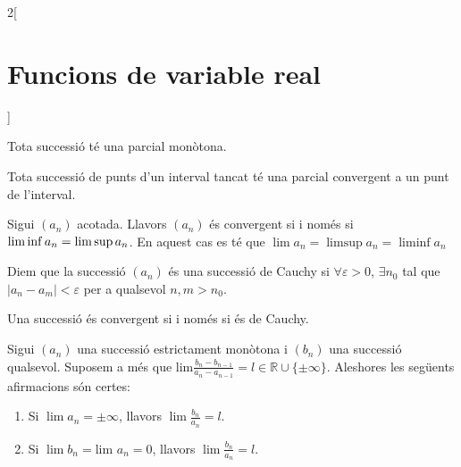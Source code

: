\documentclass[class=article,10pt,crop=false]{standalone}
\begin{document}
\begin{multicols}{2}[\section{Funcions de variable real}]
\begin{prop}
\end{prop}
\begin{prop}
Tota successió té una parcial mo\-nò\-to\-na.
\end{prop}
\begin{theorem}
Tota successió de punts d’un interval tancat té una parcial convergent a un punt de l'interval.
\end{theorem}
\begin{lemma}
Sigui $(a_n)$ acotada. Llavors $(a_n)$ és convergent si i només si $\liminf a_n\\=\limsup a_n$. En aquest cas es té que $\lim a_n=\limsup a_n=\liminf a_n$
\end{lemma}
\begin{definition}
Diem que la successió $(a_n)$ és una successió de Cauchy si $\forall \varepsilon>0$, $\exists n_0$ tal que $|a_n-a_m|<\varepsilon$ per a qualsevol $n,m>n_0$.
\end{definition}
\begin{theorem}
Una successió és convergent si i només si és de Cauchy.
\end{theorem}
\begin{theorem}
Sigui $(a_n)$ una successió estrictament monòtona i $(b_n)$ una successió qualsevol. Suposem a més que $\text{lim}\frac{b_n-b_{n-1}}{a_n-a_{n-1}}=l\in\mathbb{R}\cup\{\pm\infty\}$. Aleshores les següents afirmacions són certes:
\begin{enumerate}
    \item Si $\lim a_n=\pm\infty$, llavors $\lim\frac{b_n}{a_n}=l$.
    \item Si $\lim b_n=\text{lim }a_n=0$, llavors $\lim\frac{b_n}{a_n}=l$.
\end{enumerate}
\end{theorem}

\end{multicols}
\end{document}
